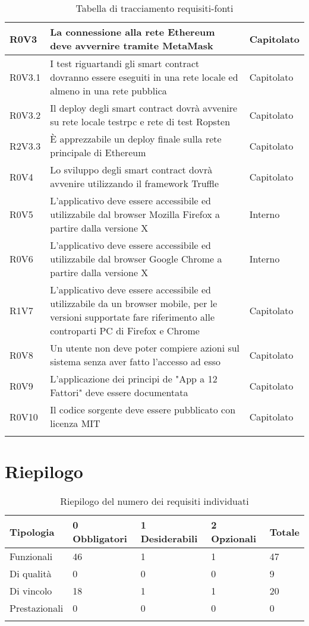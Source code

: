 \documentclass[AnalisiDeiRequisiti.tex]{subfiles}
\begin{document}
\begin{longtable}[H]{|p{2cm}|p{5cm}|p{5cm}|}
	R0V3 &  La connessione alla rete Ethereum deve avvernire tramite MetaMask & Capitolato \\ \hline
	R0V3.1 &  I test riguartandi gli smart contract dovranno essere eseguiti in una rete locale ed almeno in una rete pubblica & Capitolato \\ \hline
	R0V3.2 &  Il deploy degli smart contract dovrà avvenire su rete locale testrpc e rete di test Ropsten & Capitolato \\ \hline
	R2V3.3 &  È apprezzabile un deploy finale sulla rete principale di Ethereum & Capitolato \\ \hline
	R0V4 &  Lo sviluppo degli smart contract dovrà avvenire utilizzando il framework Truffle & Capitolato \\ \hline
	R0V5 &  L'applicativo deve essere accessibile ed utilizzabile dal browser Mozilla Firefox a partire dalla versione X & Interno \\ \hline
	R0V6 &  L'applicativo deve essere accessibile ed utilizzabile dal browser Google Chrome a partire dalla versione X & Interno \\ \hline
	R1V7 &  L'applicativo deve essere accessibile ed utilizzabile da un browser mobile, per le versioni supportate fare riferimento alle controparti PC di Firefox e Chrome & Capitolato \\ \hline
	R0V8 &  Un utente non deve poter compiere azioni sul sistema senza aver fatto l'accesso ad esso & Capitolato \\ \hline
	R0V9 &  L'applicazione dei principi de "App a 12 Fattori" deve essere documentata & Capitolato \\ \hline
	R0V10 &  Il codice sorgente deve essere pubblicato con licenza MIT & Capitolato \\ \hline
	\caption{Tabella di tracciamento requisiti-fonti}
\end{longtable}

\section{Riepilogo}

\label{table:Riepilogo del numero dei requisiti individuati}
\begin{longtable}[H]{|p{2.8cm}|p{2.9cm}|p{2.9cm}|p{2.9cm}|p{1.5cm}|}
	\hline
	\rowcolor[HTML]{38FFF8} 
	\textbf{Tipologia} & \textbf{0 Obbligatori} & \textbf{1 Desiderabili} & \textbf{2 Opzionali} & \textbf{Totale} \\ \hline
	Funzionali & 46 & 1 & 1 & 47 \\ \hline
	Di qualità & 0 & 0 & 0 & 9 \\ \hline
	Di vincolo & 18 & 1 & 1 & 20 \\ \hline
	Prestazionali & 0 & 0 & 0 & 0 \\ \hline
	
	\caption{Riepilogo del numero dei requisiti individuati}
\end{longtable}
\end{document}
